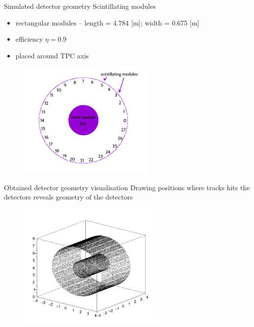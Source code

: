 \documentclass{beamer}
\begin{document}
\begin{frame}{Simulated detector geometry}
Scintillating modules
\begin{itemize}
\item rectangular modules -- length = 4.784 [m]; width = 0.675 [m] 
\item efficiency $\eta = 0.9$
\item placed around TPC axis
\end{itemize}
\begin{figure}
\includegraphics[width=0.6\textwidth]{images/num.png}
\end{figure}
\end{frame}

\begin{frame}{Obtained detector geometry visualisation}
Drawing positions where tracks hits the detectors reveals geometry of the detectors
\begin{figure}
\includegraphics[width=0.65\textwidth]{images/all_modules.png}
\end{figure}
\end{frame}
\end{document}
